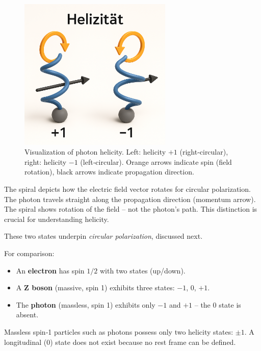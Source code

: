 \begin{figure}[H]
	\centering
	\includegraphics[width=0.65\textwidth]{bilder/Helizitaet.png}
	\caption{Visualization of photon helicity. Left: helicity $+1$ (right‑circular), right: helicity $-1$ (left‑circular). Orange arrows indicate spin (field rotation), black arrows indicate propagation direction.}
	\label{fig:helizitaet}
\end{figure}

\begin{tcolorbox}[physikbox, title=Comment on the Illustration]
	\label{box:Kommentar zur Darstellung}
	The spiral depicts how the electric field vector rotates for circular polarization. The photon travels straight along the propagation direction (momentum arrow). The spiral shows rotation of the field – not the photon’s path. This distinction is crucial for understanding helicity.
\end{tcolorbox}
\vspace{1em}
These two states underpin \textit{circular polarization}, discussed next.

\newpage
\noindent
For comparison:
\begin{itemize}
	\item An \textbf{electron} has spin $1/2$ with two states (up/down).
	\item A \textbf{Z boson} (massive, spin 1) exhibits three states: $-1$, $0$, $+1$.
	\item The \textbf{photon} (massless, spin 1) exhibits only $-1$ and $+1$ – the $0$ state is absent.
\end{itemize}
\vspace{1em}
\begin{tcolorbox}[physikbox, title=Didactic Rule of Thumb]
	\label{box:didaktischerMerksatz}
	Massless spin‑1 particles such as photons possess only two helicity states: \textbf{$\pm1$}. A longitudinal ($0$) state does not exist because no rest frame can be defined.
\end{tcolorbox}
\vspace{1em}

